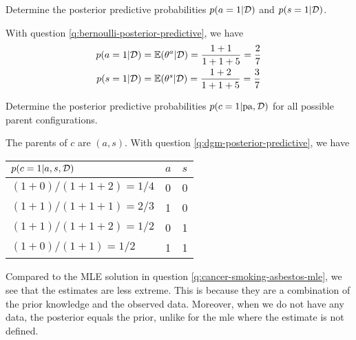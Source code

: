 \begin{exenumerate}
\item Determine the posterior predictive probabilities $p(a =1 |\mathcal{D})$ and $p(s=1|\mathcal{D})$. 
  \begin{solution}
    With  question
    \ref{q:bernoulli-posterior-predictive}, we have
    \begin{align}
      p(a =1 |\mathcal{D}) &= \mathbb{E}(\theta^a | \mathcal{D}) = \frac{1 + 1}{1+1+5} = \frac{2}{7}\\
      p(s=1|\mathcal{D}) &=\mathbb{E}(\theta^s | \mathcal{D}) = \frac{1 + 2}{1+1+5} = \frac{3}{7}
    \end{align}
  \end{solution}

\item Determine the posterior predictive probabilities $p(c=1 | \mathrm{pa},
  \mathcal{D})$ for all possible parent configurations.
 
  \begin{solution}
    The parents of $c$ are $(a,s)$. With
     question
    \ref{q:dgm-posterior-predictive}, we have
    \begin{center}
      \begin{tabular}{@{}lll@{}}
        \toprule
        $p(c=1 | a,s, \mathcal{D})$ & $a$ & $s$\\
        \midrule
        $(1+0)/(1+1+2)=1/4 $ & 0 & 0\\
        $(1+1)/(1+1+1)=2/3 $ & 1 & 0\\
        $(1+1)/(1+1+2)=1/2 $ & 0 & 1\\
        $(1+0)/(1+1)=1/2 $ & 1 & 1\\
        \bottomrule
      \end{tabular}
    \end{center}
    Compared to the MLE solution in
     question
    \ref{q:cancer-smoking-asbestos-mle}, we see that the estimates are
    less extreme. This is because they are a combination of the prior
    knowledge and the observed data. Moreover, when we do not have any
    data, the posterior equals the prior, unlike for the mle where the
    estimate is not defined.

  \end{solution}
  
\end{exenumerate}



